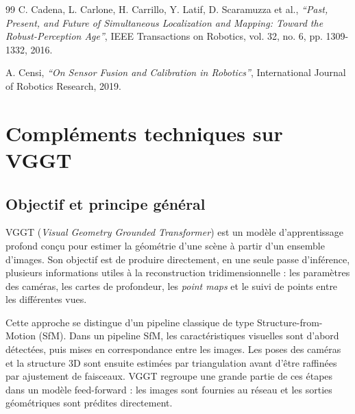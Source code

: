 \documentclass[12pt,a4paper,oneside]{report}
\begin{document}
\begin{thebibliography}{99}
C. Cadena, L. Carlone, H. Carrillo, Y. Latif, D. Scaramuzza et al., \textit{``Past, Present, and Future of Simultaneous Localization and Mapping: Toward the Robust-Perception Age''}, IEEE Transactions on Robotics, vol. 32, no. 6, pp. 1309-1332, 2016.

A. Censi, \textit{``On Sensor Fusion and Calibration in Robotics''}, International Journal of Robotics Research, 2019.

\end{thebibliography}


\listoffigures
\cleardoublepage

\appendix

\chapter{Compléments techniques sur VGGT}

\section{Objectif et principe général}

VGGT (\textit{Visual Geometry Grounded Transformer}) est un modèle d'apprentissage profond conçu pour estimer la géométrie d'une scène à partir d'un ensemble d'images. Son objectif est de produire directement, en une seule passe d'inférence, plusieurs informations utiles à la reconstruction tridimensionnelle : les paramètres des caméras, les cartes de profondeur, les \textit{point maps} et le suivi de points entre les différentes vues.

Cette approche se distingue d'un pipeline classique de type Structure-from-Motion (SfM). Dans un pipeline SfM, les caractéristiques visuelles sont d'abord détectées, puis mises en correspondance entre les images. Les poses des caméras et la structure 3D sont ensuite estimées par triangulation avant d'être raffinées par ajustement de faisceaux. VGGT regroupe une grande partie de ces étapes dans un modèle feed-forward : les images sont fournies au réseau et les sorties géométriques sont prédites directement.
\end{document}
